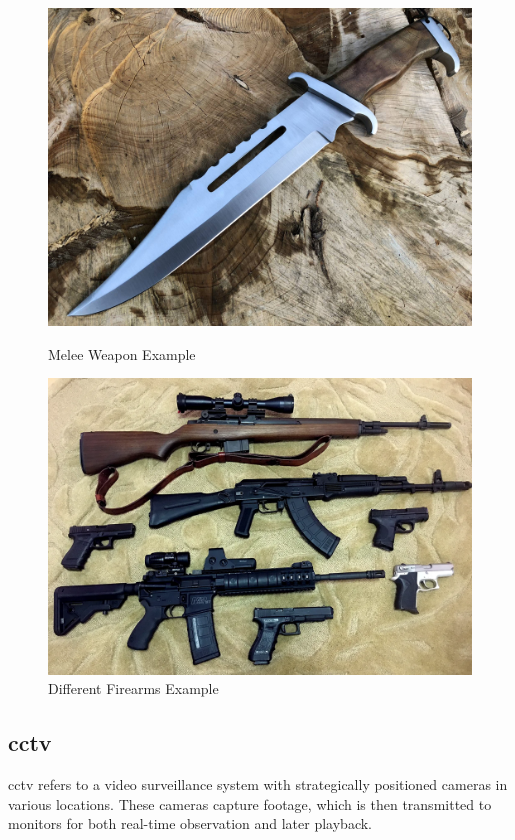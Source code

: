 \begin{figure}[h]
    \centering
    \begin{minipage}{0.45\textwidth}
        \centering
        \includegraphics[width=1\linewidth]{figs/knife.jpg}
        \caption{Melee Weapon Example}
        \label{fig:first_image}
    \end{minipage}\hfill
    \begin{minipage}{0.48\textwidth}
        \centering
        \includegraphics[width=1\linewidth]{figs/firearm.png}
        \caption{Different Firearms Example}
        \label{fig:second_image}
    \end{minipage}
\end{figure}

\subsection{\ac{cctv}}
\ac{cctv} refers to a video surveillance system with strategically positioned cameras in various locations. These cameras capture footage, which is then transmitted to monitors for both real-time observation and later playback.

